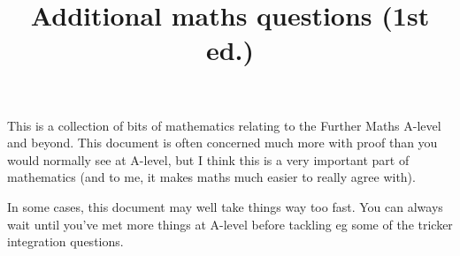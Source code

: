 \documentclass[fleqn,a4paper,11pt]{article}
\date{}
\author{}
\title{Additional maths questions (1st ed.)}
\begin{document}
 \maketitle
 This is a collection of bits of mathematics relating to the Further Maths
 A-level and beyond. This document is often concerned much more with proof than
 you would normally see at A-level, but I think this is a very important part of
 mathematics (and to me, it makes maths much easier to really agree with).

 In some cases, this document may well take things way too fast. You can always
 wait until you've met more things at A-level before tackling eg some of the
 tricker integration questions.

 
 
 
 
 
 
 
\end{document}
